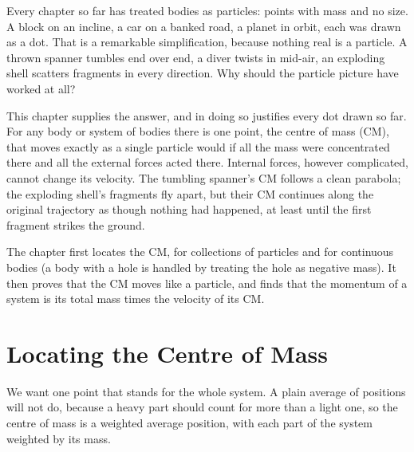 
\label{ch:com}

Every chapter so far has treated bodies as particles: points with mass and no size. A block on an incline,
a car on a banked road, a planet in orbit, each was drawn as a dot. That is a remarkable simplification,
because nothing real is a particle. A thrown spanner tumbles end over end, a diver twists in mid-air, an
exploding shell scatters fragments in every direction. Why should the particle picture have worked at all?

This chapter supplies the answer, and in doing so justifies every dot drawn so far. For any body or system of
bodies there is one point, the centre of mass (CM), that moves exactly as a single particle would if all the mass
were concentrated there and all the external forces acted there. Internal forces, however complicated, cannot
change its velocity. The tumbling spanner's CM follows a clean parabola; the exploding shell's fragments fly
apart, but their CM continues along the original trajectory as though nothing had happened, at least until
the first fragment strikes the ground.

The chapter first locates the CM, for collections of particles and for continuous bodies (a body with a hole
is handled by treating the hole as negative mass). It then proves that the CM moves like a particle, and
finds that the momentum of a system is its total mass times the velocity of its CM.

\section{Locating the Centre of Mass}

We want one point that stands for the whole system. A plain average of positions will not do, because a
heavy part should count for more than a light one, so the centre of mass is a weighted average position, with
each part of the system weighted by its mass.

